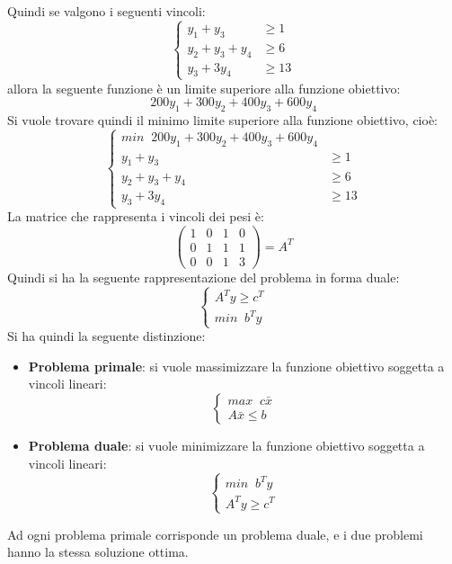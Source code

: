 \documentclass[a4paper]{article}
\begin{document}
\begin{example}
  Quindi se valgono i seguenti vincoli:
  \[
    \begin{cases}
      y_1 + y_3 & \ge 1\\
      y_2 + y_3 + y_4 & \ge 6\\
      y_3 + 3y_4 & \ge 13
    \end{cases}
  \] 
  allora la seguente funzione è un limite superiore alla funzione obiettivo:
  \[
    200 y_1 + 300 y_2 + 400 y_3 + 600 y_4
  \] 
  Si vuole trovare quindi il minimo limite superiore alla funzione obiettivo, cioè:
  \[
    \begin{cases}
      min \;\; 200 y_1 + 300 y_2 + 400 y_3 + 600 y_4 \\
      y_1 + y_3 & \ge 1\\
      y_2 + y_3 + y_4 & \ge 6\\
      y_3 + 3y_4 & \ge 13
    \end{cases}
  \] 
  La matrice che rappresenta i vincoli dei pesi è:
  \[
    \begin{pmatrix} 
      1 & 0 & 1 & 0 \\
      0 & 1 & 1 & 1 \\
      0 & 0 & 1 & 3
    \end{pmatrix} = A^T
  \] 
  Quindi si ha la seguente rappresentazione del problema in forma duale:
  \[
    \begin{cases}
      A^T y \ge c^T\\
      min \;\; b^T y
    \end{cases}
  \] 
  Si ha quindi la seguente distinzione:
  \begin{itemize}
    \item \textbf{Problema primale}: si vuole massimizzare la funzione obiettivo
      soggetta a vincoli lineari:
      \[
        \begin{cases}
          max \;\; c \bar{x}\\
          A \bar{x} \le b
        \end{cases}
      \] 
    \item \textbf{Problema duale}: si vuole minimizzare la funzione obiettivo
      soggetta a vincoli lineari:
      \[
        \begin{cases}
          min \;\; b^T y\\
          A^T y \ge c^T
        \end{cases}
      \]
  \end{itemize}
  Ad ogni problema primale corrisponde un problema duale, e i due problemi
  hanno la stessa soluzione ottima.
\end{example}
\end{document}
